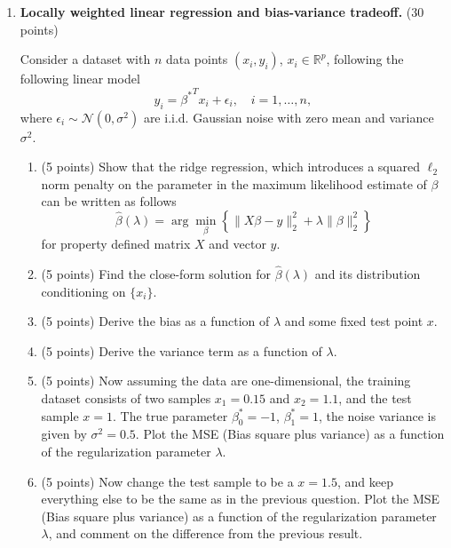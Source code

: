 \documentclass[twoside,10pt]{article}
\begin{document}
\begin{enumerate}
\begin{enumerate}
\end{enumerate}

\clearpage 

\item {\bf Locally weighted linear regression and bias-variance tradeoff.} (30 points)

Consider a dataset with $n$ data points $(x_i, y_i)$, $x_i \in \mathbb R^p$, following the following linear model
\[
y_i = {\beta^*}^T x_i + \epsilon_i, \quad i = 1, \ldots, n,
\]
where $\epsilon_i \sim \mathcal N(0, \sigma^2)$ are i.i.d. Gaussian noise with zero mean and variance $\sigma^2$.

 
\begin{enumerate}

\item (5 points) Show that the ridge regression, which introduces a squared $\ell_2$ norm penalty on the parameter in the maximum likelihood estimate of $\beta$ can be written as follows
\[
\hat \beta (\lambda) = \arg \min_{\beta} 
\left\{
\|X \beta - y\|_2^2 + \lambda \|\beta\|_2^2
\right\}
\]
for property defined matrix $X$ and vector $y$. 


\item (5 points) Find the close-form solution for $\widehat {\beta}(\lambda)$ and its distribution conditioning on $\{x_i\}$.

\item (5 points) Derive the bias as a function of $\lambda$ and some fixed test point $x$.

\item (5 points) Derive the variance term as a function of $\lambda$.

\item (5 points) Now assuming the data are one-dimensional, the training dataset consists of two samples $x_1 = 0.15$ and $x_2 = 1.1$,  and the test sample $x = 1$. The true parameter $\beta_0^* = -1$, $\beta_1^* = 1$, the noise variance is given by $\sigma^2 = 0.5$. Plot the MSE (Bias square plus variance) as a function of the regularization parameter $\lambda$. 

\item (5 points) Now change the test sample to be a $x=1.5$, and keep everything else to be the same as in the previous question. Plot the MSE (Bias square plus variance) as a function of the regularization parameter $\lambda$, and comment on the difference from the previous result. 



\end{enumerate} 




\end{enumerate}
\end{document}
